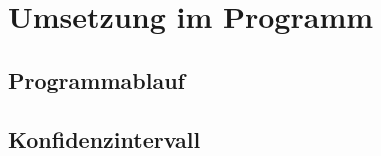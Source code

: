 
\section{Umsetzung im Programm}
\label{sec:umsetzung_im_programm}

\subsection{Programmablauf}
\label{sec:programmablauf}

\subsection{Konfidenzintervall}
\label{sec:konfidenzintervall}